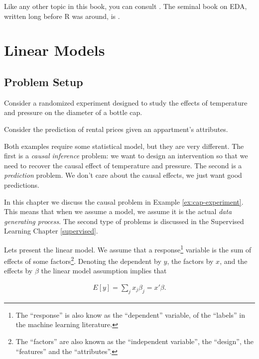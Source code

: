 \documentclass[]{book}
\theoremstyle{definition}
\theoremstyle{definition}
\theoremstyle{remark}
\let\BeginKnitrBlock\begin \let\EndKnitrBlock\end
\begin{document}
Like any other topic in this book, you can consult
\citet{venables2013modern}. The seminal book on EDA, written long before
R was around, is \citet{tukey1977exploratory}.

\chapter{Linear Models}\label{lm}

\section{Problem Setup}\label{problem-setup}

\BeginKnitrBlock{example}
\protect\hypertarget{ex:cap-experiment}{}{\label{ex:cap-experiment}}Consider
a randomized experiment designed to study the effects of temperature and
pressure on the diameter of a bottle cap.
\EndKnitrBlock{example}

\BeginKnitrBlock{example}
\protect\hypertarget{ex:rental}{}{\label{ex:rental}}Consider the prediction
of rental prices given an appartment's attributes.
\EndKnitrBlock{example}

Both examples require some statistical model, but they are very
different. The first is a \emph{causal inference} problem: we want to
design an intervention so that we need to recover the causal effect of
temperature and pressure. The second is a \emph{prediction} problem. We
don't care about the causal effects, we just want good predictions.

In this chapter we discuss the causal problem in Example
\ref{ex:cap-experiment}. This means that when we assume a model, we
assume it is the actual \emph{data generating process}. The second type
of problems is discussed in the Supervised Learning Chapter
\ref{supervised}.

Lets present the linear model. We assume that a response\footnote{The
  ``response'' is also know as the ``dependent'' variable, of the
  ``labels'' in the machine learning literature.} variable is the sum of
effects of some factors\footnote{The ``factors'' are also known as the
  ``independent variable'', the ``design'', the ``features'' and the
  ``attributes''.}. Denoting the dependent by \(y\), the factors by
\(x\), and the effects by \(\beta\) the linear model assumption implies
that

\begin{align}
  E[y]=\sum_j x_j \beta_j=x'\beta .
  \label{eq:linear-mean}
\end{align}
\end{document}

